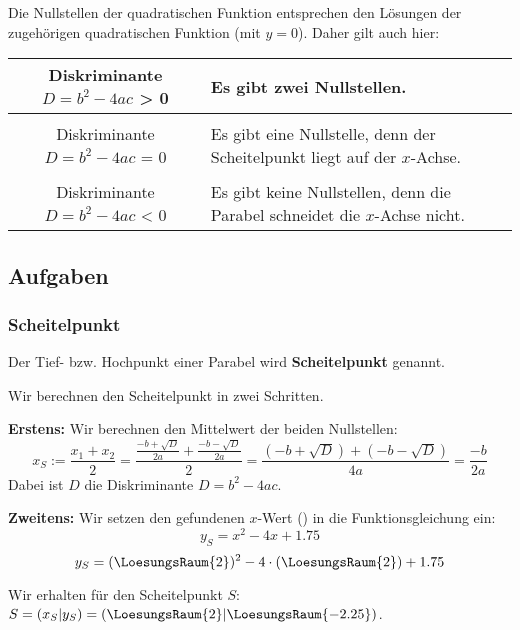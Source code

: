 \begin{bemerkung}{}{}
  Die Nullstellen der quadratischen Funktion entsprechen den Lösungen
  der zugehörigen quadratischen Funktion (mit $y=0$). Daher gilt
  auch hier: 


  \begin{tabular}{c|p{8cm}}
    Diskriminante $D=b^2-4ac$ > 0 & Es gibt zwei Nullstellen. \\
    \hline\\
    Diskriminante $D=b^2-4ac$ = 0 & Es gibt eine Nullstelle, denn der Scheitelpunkt liegt auf der $x$-Achse.\\
    \hline\\
    Diskriminante $D=b^2-4ac$ < 0 & Es gibt keine Nullstellen, denn die Parabel schneidet die $x$-Achse nicht.\\
  \end{tabular}
  
 \fi{} 
\end{bemerkung}

\subsection*{Aufgaben}

\newpage



\subsubsection{Scheitelpunkt}
Der Tief- bzw. Hochpunkt einer Parabel wird \textbf{Scheitelpunkt}
genannt.

Wir berechnen den Scheitelpunkt in zwei Schritten.

\textbf{Erstens:} Wir berechnen den Mittelwert der beiden Nullstellen:
$$x_S := \frac{x_{1} + x_{2}}{2} = \frac{\frac{-b+\sqrt{D}}{2a} + \frac{-b-\sqrt{D}}{2a}}{2} =
\frac{(-b+\sqrt{D}) + (-b-\sqrt{D})}{4a} =\frac{-b}{2a}$$
Dabei ist $D$ die Diskriminante $D=b^2-4ac$.


\textbf{Zweitens:} Wir setzen den gefundenen $x$-Wert
() in die Funktionsgleichung
ein:
$$y_S = x^2 - 4x + 1.75$$
$$y_S = (\LoesungsRaum{2})^2 - 4\cdot{}(\LoesungsRaum{2}) + 1.75$$

Wir erhalten für den Scheitelpunkt $S$: $S=(x_S | y_S) = (\LoesungsRaum{2} | \LoesungsRaum{-2.25})$.


